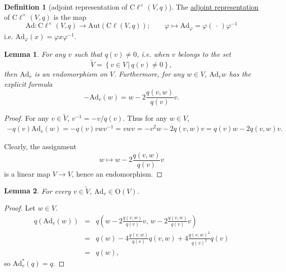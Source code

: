 \documentclass[a4paper,10pt]{scrreprt}
\newcommand{\defn}[1]{\ul{#1}}
\newcommand{\cliff}{\mathrm{C}\ell}
\newcommand{\Ad}{\mathrm{Ad}}
\newcommand{\Or}{\mathrm{O}}
\theoremstyle{definition}
\newtheorem{definition}{Definition}[section]
\theoremstyle{plain}
\newtheorem{lemma}{Lemma}[section]
\theoremstyle{remark}
\begin{document}
\begin{definition}[adjoint representation of $\cliff^{\times}(V ,q)$]
  \label{def:adjointrepresentationofcliffordalgebra}
  The \defn{adjoint representation} of $\cliff^{\times}(V, q)$ is the map
  \begin{equation*}
    \Ad\colon \cliff^{\times}(V, q) \to \mathrm{Aut}(\cliff(V, q));\qquad \varphi \mapsto \Ad_{\varphi} = \varphi(\,\cdot\,) \varphi^{-1}
  \end{equation*}
  i.e. $\Ad_{\varphi}(x) = \varphi x \varphi^{-1}$.
\end{definition}

\begin{lemma}
  \label{lemma:expressionforad}
  For any $v$ such that $q(v) \neq 0$, i.e. when $v$ belongs to the set
  \begin{equation*}
    \tilde{V} = \left\{ v \in V\,\big|\, q(v) \neq 0 \right\},
  \end{equation*}
  then $\Ad_{v}$ is an endomorphism on $V$. Furthermore, for any $w \in V$, $\Ad_{v}w$ has the explicit formula
  \begin{equation*}
    -\Ad_{v}(w) = w - 2\frac{q(v, w)}{q(v)}v.
  \end{equation*}
\end{lemma}
\begin{proof}
  For any $v \in \tilde{V}$, $v^{-1} = -v/q(v)$. Thus for any $w \in V$,
  \begin{align*}
    -q(v) \Ad_{v}(w) = -q(v) vwv^{-1} = vwv = -v^2 w -2q(v, w)v = q(v) w - 2q(v,w) v.
  \end{align*}

  Clearly, the assignment
  \begin{equation*}
    w \mapsto w - 2\frac{q(v, w)}{q(v)}v
  \end{equation*}
  is a linear map $V \to V$, hence an endomorphism.
\end{proof}

\begin{lemma}
  For every $v \in \tilde{V}$, $\Ad_{v} \in \Or(V)$.
\end{lemma}
\begin{proof}
  Let $w \in V$.
  \begin{eqnarray*}
    q(\Ad_{v}(w)) &=& q\left(w - 2\frac{q(v,w)}{q(v)} v,\, w - 2\frac{q(v,w)}{q(v)} v\right) \\
    &=& q(w) - 4\frac{q(v,w)}{q(v)}q(v, w) + 4\frac{q(v, w)^{2}}{q(v)^{2}} q(v) \\
    &=& q(w),
  \end{eqnarray*} 
  so $\Ad_{v}^{*}(q) = q$.
\end{proof}
\end{document}

